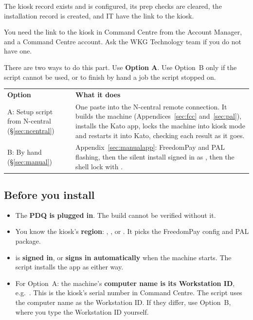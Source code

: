 \documentclass[a4paper,10pt]{article}
\begin{document}
\begin{wkinfo}
The kiosk record exists and is configured, its prep checks are cleared,
the installation record is created, and IT have the link to the kiosk.
\end{wkinfo}

\label{sec:part2}

You need the link to the kiosk in Command Centre from the Account Manager,
and a Command Centre account. Ask the WKG Technology team if you do not
have one.

There are two ways to do this part. Use \textbf{Option A}. Use Option~B
only if the script cannot be used, or to finish by hand a job the script
stopped on.

\begin{center}
\renewcommand{\arraystretch}{1.35}\small
\begin{tabularx}{\textwidth}{L{44mm} X}
\color{white}\textbf{Option} &
\color{white}\textbf{What it does}\\
A: Setup script from N-central (\S\ref{sec:ncentral}) &
One paste into the N-central remote connection. It builds the machine
(Appendices~\ref{sec:fcc} and~\ref{sec:pal}), installs the Kato app, locks the machine into
kiosk mode and restarts it into Kato, checking each result as it goes.\\
B: By hand (\S\ref{sec:manual}) &
Appendix~\ref{sec:manualapp}: FreedomPay and PAL flashing, then the
silent install signed in as , then the shell lock with
.\\
\end{tabularx}
\end{center}

\subsection{Before you install}\label{sec:preinstall}

\begin{itemize}
  \item The \textbf{PDQ is plugged in}. The build cannot be verified
        without it.
  \item You know the kiosk's \textbf{region}: , ,
         or . It picks the FreedomPay config and PAL
        package.
  \item {} is \textbf{signed in}, or \textbf{signs in
        automatically} when the machine starts. The script installs the
        app as  either way.
  \item For Option~A: the machine's \textbf{computer name is its
        Workstation ID}, e.g.\ . This is the kiosk's
        serial number in Command Centre. The script uses the computer name as the
        Workstation ID. If they differ, use Option~B, where you type the
        Workstation ID yourself.
\end{itemize}
\end{document}

